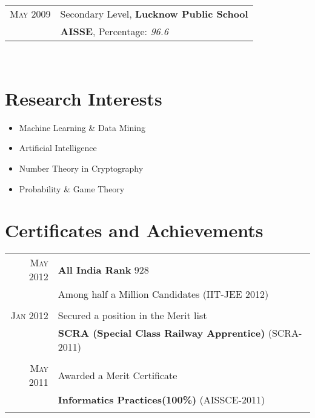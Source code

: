 \documentclass[10pt]{article} %
\begin{document}
{\begin{minipage}[t]{0.5\textwidth}
\begin{tabular}{rl}

\textsc{May} 2009 & Secondary Level, \textbf{Lucknow Public School}\\
&\textbf{AISSE}, Percentage: \emph{96.6}\\

\end{tabular}\\[10pt]


\section{Research Interests} 
\begin{itemize} \itemsep1pt
\item Machine Learning \& Data Mining
\item Artificial Intelligence
\item Number Theory in Cryptography
\item Probability \& Game Theory
\end{itemize}
	
\section{Certificates and Achievements}

\begin{tabular}{rl}
\textsc{May} 2012 & \textbf{All India Rank} 928 \\
&Among half a Million Candidates \footnotesize(IIT-JEE 2012)\normalsize\\\\

\textsc{Jan} 2012 & Secured a position in the Merit list\\
&  \textbf{SCRA (Special Class Railway Apprentice) }\footnotesize(SCRA-2011)\normalsize\\\\

\textsc{May} 2011 & Awarded a Merit Certificate\\
& \textbf{Informatics Practices(100\%) }\footnotesize(AISSCE-2011)\normalsize\\\\


\end{tabular}
\end{minipage}}
\end{document}
